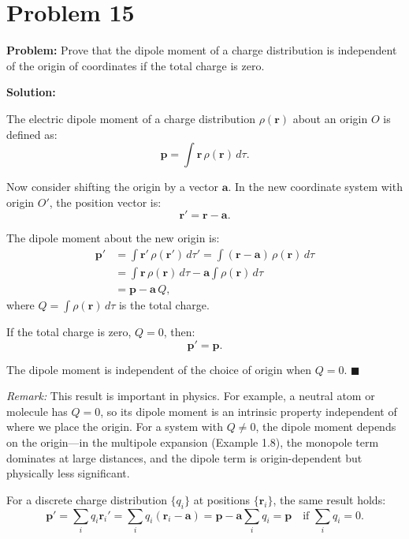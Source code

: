 \documentclass[12pt]{article}
\newcommand{\vect}[1]{\mathbf{#1}}
\begin{document}
\section*{Problem 15}

\textbf{Problem:} Prove that the dipole moment of a charge distribution is independent of the origin of coordinates if the total charge is zero.

\bigskip
\textbf{Solution:}

The electric dipole moment of a charge distribution $\rho(\vect{r})$ about an origin $O$ is defined as:
\[
\vect{p} = \int \vect{r}\,\rho(\vect{r})\,d\tau.
\]

Now consider shifting the origin by a vector $\vect{a}$. In the new coordinate system with origin $O'$, the position vector is:
\[
\vect{r}' = \vect{r} - \vect{a}.
\]

The dipole moment about the new origin is:
\begin{align}
\vect{p}' &= \int \vect{r}'\,\rho(\vect{r}')\,d\tau' = \int (\vect{r} - \vect{a})\,\rho(\vect{r})\,d\tau \\
&= \int \vect{r}\,\rho(\vect{r})\,d\tau - \vect{a}\int \rho(\vect{r})\,d\tau \\
&= \vect{p} - \vect{a}\,Q,
\end{align}
where $Q = \int\rho(\vect{r})\,d\tau$ is the total charge.

If the total charge is zero, $Q = 0$, then:
\[
\boxed{\vect{p}' = \vect{p}}.
\]

The dipole moment is independent of the choice of origin when $Q = 0$. \hfill $\blacksquare$

\bigskip
\textit{Remark:} This result is important in physics. For example, a neutral atom or molecule has $Q = 0$, so its dipole moment is an intrinsic property independent of where we place the origin. For a system with $Q \neq 0$, the dipole moment depends on the origin---in the multipole expansion (Example 1.8), the monopole term dominates at large distances, and the dipole term is origin-dependent but physically less significant.

For a discrete charge distribution $\{q_i\}$ at positions $\{\vect{r}_i\}$, the same result holds:
\[
\vect{p}' = \sum_i q_i \vect{r}_i' = \sum_i q_i(\vect{r}_i - \vect{a}) = \vect{p} - \vect{a}\sum_i q_i = \vect{p} \quad \text{if } \sum_i q_i = 0.
\]
\end{document}
